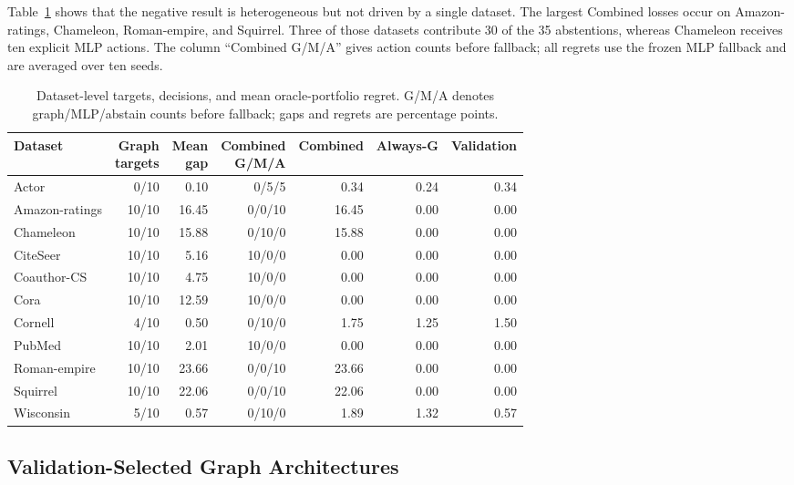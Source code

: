Table~\ref{tab:dataset_decisions} shows that the negative result is heterogeneous but not driven by a single dataset. The largest Combined losses occur on Amazon-ratings, Chameleon, Roman-empire, and Squirrel. Three of those datasets contribute 30 of the 35 abstentions, whereas Chameleon receives ten explicit MLP actions. The column ``Combined G/M/A'' gives action counts before fallback; all regrets use the frozen MLP fallback and are averaged over ten seeds.

\begin{table}[ht]
\centering
\caption{Dataset-level targets, decisions, and mean oracle-portfolio regret. G/M/A denotes graph/MLP/abstain counts before fallback; gaps and regrets are percentage points.}
\label{tab:dataset_decisions}
\scriptsize
\setlength{\tabcolsep}{2.0pt}
\begin{tabular}{@{}lrrrrrr@{}}
\toprule
Dataset & \shortstack{Graph\\targets} & \shortstack{Mean\\gap} & \shortstack{Combined\\G/M/A} & Combined & Always-G & Validation \\
\midrule
Actor & 0/10 & 0.10 & 0/5/5 & 0.34 & 0.24 & 0.34 \\
Amazon-ratings & 10/10 & 16.45 & 0/0/10 & 16.45 & 0.00 & 0.00 \\
Chameleon & 10/10 & 15.88 & 0/10/0 & 15.88 & 0.00 & 0.00 \\
CiteSeer & 10/10 & 5.16 & 10/0/0 & 0.00 & 0.00 & 0.00 \\
Coauthor-CS & 10/10 & 4.75 & 10/0/0 & 0.00 & 0.00 & 0.00 \\
Cora & 10/10 & 12.59 & 10/0/0 & 0.00 & 0.00 & 0.00 \\
Cornell & 4/10 & 0.50 & 0/10/0 & 1.75 & 1.25 & 1.50 \\
PubMed & 10/10 & 2.01 & 10/0/0 & 0.00 & 0.00 & 0.00 \\
Roman-empire & 10/10 & 23.66 & 0/0/10 & 23.66 & 0.00 & 0.00 \\
Squirrel & 10/10 & 22.06 & 0/0/10 & 22.06 & 0.00 & 0.00 \\
Wisconsin & 5/10 & 0.57 & 0/10/0 & 1.89 & 1.32 & 0.57 \\
\bottomrule
\end{tabular}
\end{table}

\subsection{Validation-Selected Graph Architectures}

